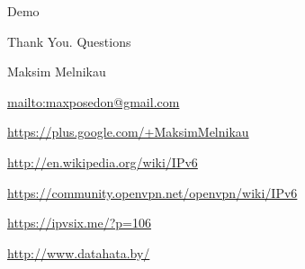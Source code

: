 \documentclass[aspectratio=169]{beamer}
\begin{document}
\begin{frame}{Demo}
\end{frame}


{

\begin{frame}{Thank You. Questions}
    \begin{block}{Maksim Melnikau}
    \par \url{mailto:maxposedon@gmail.com}
    \par \url{https://plus.google.com/+MaksimMelnikau}
    \par \url{http://en.wikipedia.org/wiki/IPv6}
    \par \url{https://community.openvpn.net/openvpn/wiki/IPv6}
    \par \url{https://ipvsix.me/?p=106}
    \par \url{http://www.datahata.by/}
    \end{block}
\end{frame}
}
\end{document}
